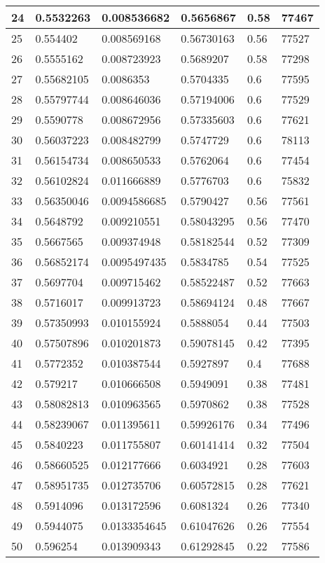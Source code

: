 \begin{longtable}{|l|l|l|l|l|l|}
24 & 0.5532263 & 0.008536682 & 0.5656867 & 0.58 & 77467 \\ \hline 
25 & 0.554402 & 0.008569168 & 0.56730163 & 0.56 & 77527 \\ \hline 
26 & 0.5555162 & 0.008723923 & 0.5689207 & 0.58 & 77298 \\ \hline 
27 & 0.55682105 & 0.0086353 & 0.5704335 & 0.6 & 77595 \\ \hline 
28 & 0.55797744 & 0.008646036 & 0.57194006 & 0.6 & 77529 \\ \hline 
29 & 0.5590778 & 0.008672956 & 0.57335603 & 0.6 & 77621 \\ \hline 
30 & 0.56037223 & 0.008482799 & 0.5747729 & 0.6 & 78113 \\ \hline 
31 & 0.56154734 & 0.008650533 & 0.5762064 & 0.6 & 77454 \\ \hline 
32 & 0.56102824 & 0.011666889 & 0.5776703 & 0.6 & 75832 \\ \hline 
33 & 0.56350046 & 0.0094586685 & 0.5790427 & 0.56 & 77561 \\ \hline 
34 & 0.5648792 & 0.009210551 & 0.58043295 & 0.56 & 77470 \\ \hline 
35 & 0.5667565 & 0.009374948 & 0.58182544 & 0.52 & 77309 \\ \hline 
36 & 0.56852174 & 0.0095497435 & 0.5834785 & 0.54 & 77525 \\ \hline 
37 & 0.5697704 & 0.009715462 & 0.58522487 & 0.52 & 77663 \\ \hline 
38 & 0.5716017 & 0.009913723 & 0.58694124 & 0.48 & 77667 \\ \hline 
39 & 0.57350993 & 0.010155924 & 0.5888054 & 0.44 & 77503 \\ \hline 
40 & 0.57507896 & 0.010201873 & 0.59078145 & 0.42 & 77395 \\ \hline 
41 & 0.5772352 & 0.010387544 & 0.5927897 & 0.4 & 77688 \\ \hline 
42 & 0.579217 & 0.010666508 & 0.5949091 & 0.38 & 77481 \\ \hline 
43 & 0.58082813 & 0.010963565 & 0.5970862 & 0.38 & 77528 \\ \hline 
44 & 0.58239067 & 0.011395611 & 0.59926176 & 0.34 & 77496 \\ \hline 
45 & 0.5840223 & 0.011755807 & 0.60141414 & 0.32 & 77504 \\ \hline 
46 & 0.58660525 & 0.012177666 & 0.6034921 & 0.28 & 77603 \\ \hline 
47 & 0.58951735 & 0.012735706 & 0.60572815 & 0.28 & 77621 \\ \hline 
48 & 0.5914096 & 0.013172596 & 0.6081324 & 0.26 & 77340 \\ \hline 
49 & 0.5944075 & 0.0133354645 & 0.61047626 & 0.26 & 77554 \\ \hline 
50 & 0.596254 & 0.013909343 & 0.61292845 & 0.22 & 77586 \\ \hline 
\end{longtable}